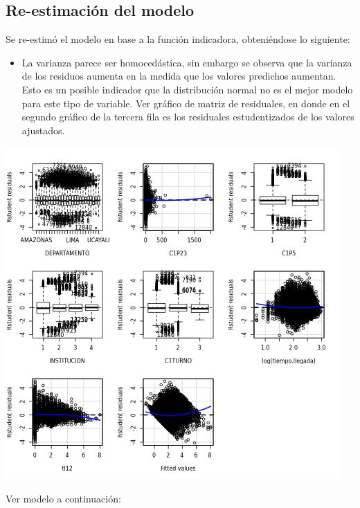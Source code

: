 \documentclass{article}
\begin{document}
\subsection{Re-estimación del modelo}
Se re-estimó el modelo en base a la función indicadora, obteniéndose lo siguiente:

\begin{itemize}
	\item La varianza parece ser homocedástica, sin embargo se observa que la varianza de los residuos aumenta en la medida que los valores predichos aumentan. Esto es un posible indicador que la distribución normal no es el mejor modelo para este tipo de variable. Ver gráfico de matriz de residuales, en donde en el segundo gráfico de la tercera fila es los residuales estudentizados de los valores ajustados.
\end{itemize}

\includegraphics[width=\textwidth]{mf_residuales.jpg}

Ver modelo a continuación:
\end{document}
